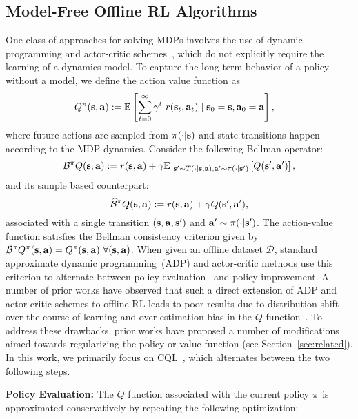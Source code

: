 \subsection{Model-Free Offline RL Algorithms}
\label{sec:conservative_model_free}
One class of approaches for solving MDPs involves the use of dynamic programming and actor-critic schemes~\cite{SuttonBook, BertsekasBook}, which do not explicitly require the learning of a dynamics model. To capture the long term behavior of a policy without a model, we define the action value function as
\begin{align}
    Q^\pi(\bs, \ba) & := \mathbb{E} \left[ \sum_{t=0}^\infty \gamma^t \ r(\bs_t, \ba_t) \mid \bs_0 = \bs, \ba_0 = \ba \right], %
\end{align}
where future actions are sampled from $\pi(\cdot|\mathbf{s})$ and state transitions happen according to the MDP dynamics. Consider the following Bellman operator:
\[
\mathcal{B}^\pi Q (\mathbf{s}, \mathbf{a}) := r(\mathbf{s}, \mathbf{a}) + \gamma \mathbb{E}_{\ \mathbf{s}' \sim T(\cdot | \mathbf{s}, \mathbf{a}), \mathbf{a}' \sim \pi(\cdot | \mathbf{s}')} \left[ Q(\mathbf{s}', \mathbf{a}') \right],
\]
and its sample based counterpart:
\[
\widehat{\mathcal{B}}^\pi Q (\mathbf{s}, \mathbf{a}) := r(\mathbf{s}, \mathbf{a}) + \gamma Q(\mathbf{s}', \mathbf{a}'),
\]
associated with a single transition $(\mathbf{s}, \mathbf{a}, \mathbf{s}')$ and $\mathbf{a}' \sim \pi (\cdot | \mathbf{s}')$. The action-value function satisfies the Bellman consistency criterion given by $\mathcal{B}^\pi Q^\pi(\mathbf{s}, \mathbf{a}) = Q^\pi (\mathbf{s}, \mathbf{a}) \ \forall (\mathbf{s}, \mathbf{a})$. When given an offline dataset $\mathcal{D}$, standard approximate dynamic programming~(ADP) and actor-critic methods use this criterion to alternate between policy evaluation~\cite{Munos2008FiniteTimeBF} and policy improvement. A number of prior works have observed that such a direct extension of ADP and actor-critic schemes to offline RL leads to poor results due to distribution shift over the course of learning and over-estimation bias in the $Q$ function~\cite{fujimoto2018off, kumar2019stabilizing, wu2019behavior}. To address these drawbacks, prior works have proposed a number of modifications aimed towards regularizing the policy or value function (see Section~\ref{sec:related}). In this work, we primarily focus on CQL~\cite{kumar2020conservative}, which alternates between the two following steps.

{\bf Policy Evaluation:} The $Q$ function associated with the current policy $\pi$ is approximated conservatively by repeating the following optimization:

